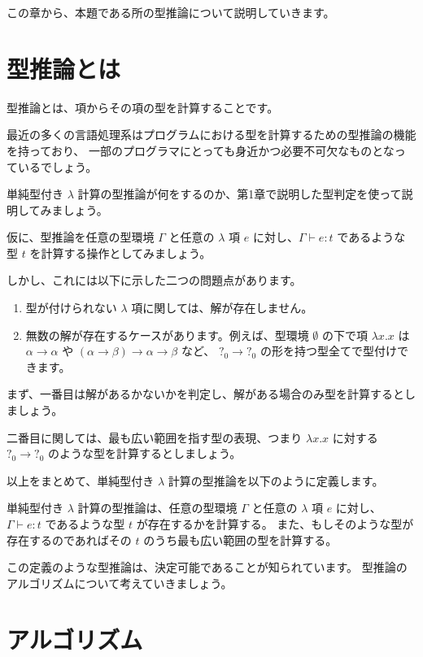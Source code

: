
この章から、本題である所の型推論について説明していきます。

\section{型推論とは}

型推論とは、項からその項の型を計算することです。

最近の多くの言語処理系はプログラムにおける型を計算するための型推論の機能を持っており、
一部のプログラマにとっても身近かつ必要不可欠なものとなっているでしょう。

単純型付き $\lambda$ 計算の型推論が何をするのか、第1章で説明した型判定を使って説明してみましょう。

仮に、型推論を任意の型環境 $\Gamma$ と任意の $\lambda$ 項 $e$ に対し、$\Gamma \vdash e : t$
であるような型 $t$ を計算する操作としてみましょう。

しかし、これには以下に示した二つの問題点があります。

\begin{enumerate}
  \item 型が付けられない $\lambda$ 項に関しては、解が存在しません。
  \item 無数の解が存在するケースがあります。例えば、型環境 $\emptyset$ の下で項 $\lambda x . x$ は
        $\alpha \to \alpha$ や $(\alpha \to \beta) \to \alpha \to \beta$ など、
        $?_0 \to ?_0$ の形を持つ型全てで型付けできます。
\end{enumerate}

まず、一番目は解があるかないかを判定し、解がある場合のみ型を計算するとしましょう。

二番目に関しては、最も広い範囲を指す型の表現、つまり $\lambda x . x$ に対する $?_0 \to ?_0$
のような型を計算するとしましょう。

以上をまとめて、単純型付き $\lambda$ 計算の型推論を以下のように定義します。

\begin{definition}
単純型付き $\lambda$ 計算の型推論は、任意の型環境 $\Gamma$ と任意の $\lambda$ 項 $e$ に対し、
$\Gamma \vdash e : t$ であるような型 $t$ が存在するかを計算する。
また、もしそのような型が存在するのであればその $t$ のうち最も広い範囲の型を計算する。
\end{definition}

この定義のような型推論は、決定可能であることが知られています。
型推論のアルゴリズムについて考えていきましょう。

\section{アルゴリズム}

